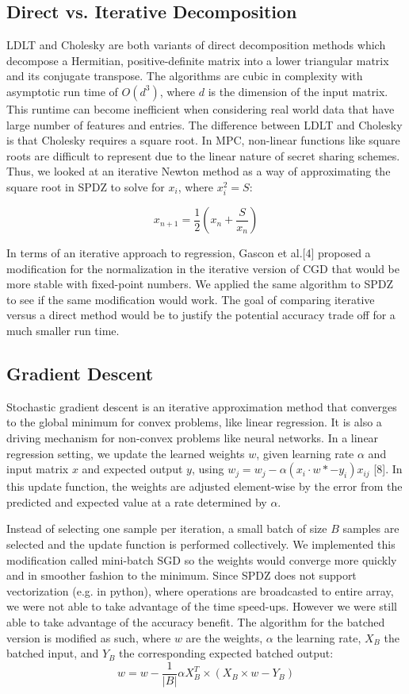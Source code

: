 \documentclass{article}
\begin{document}
\subsection{Direct vs. Iterative Decomposition}

LDLT and Cholesky are both variants of direct decomposition methods which decompose a Hermitian, positive-definite matrix into a lower triangular matrix and its conjugate transpose. The algorithms are cubic in complexity with asymptotic run time of $O(d^3)$, where $d$ is the dimension of the input matrix. This runtime can become inefficient when considering real world data that have large number of features and entries. The difference between LDLT and Cholesky is that Cholesky requires a square root. In MPC, non-linear functions like square roots are difficult to represent due to the linear nature of secret sharing schemes. Thus, we looked at an iterative Newton method as a way of approximating the square root in SPDZ to solve for $x_i$, where $x_{i}^2 = S$:

\[
x_{n+1} = \frac{1}{2} (x_{n} + \frac{S}{x_{n}})
\]

In terms of an iterative approach to regression, Gascon et al.[4] proposed a modification for the normalization in the iterative version of CGD that would be more stable with fixed-point numbers. We applied the same algorithm to SPDZ to see if the same modification would work. The goal of comparing iterative versus a direct method would be to justify the potential accuracy trade off for a much smaller run time.

\subsection{Gradient Descent}

Stochastic gradient descent is an iterative approximation method that converges to the global minimum for convex problems, like linear regression. It is also a driving mechanism for non-convex problems like neural networks. In a linear regression setting, we update the learned weights $w$, given learning rate $\alpha$ and input matrix $x$ and expected output $y$, using $w_j = w_j  - \alpha(x_i \cdot w *-y_i)x_{ij}$ [8]. In this update function, the weights are adjusted element-wise by the error from the predicted and expected value at a rate determined by $\alpha$.

Instead of selecting one sample per iteration, a small batch of size $B$ samples are selected and the update function is performed collectively. We implemented this modification called mini-batch SGD so the weights would converge more quickly and in smoother fashion to the minimum. Since SPDZ does not support vectorization (e.g. in python), where operations are broadcasted to entire array, we were not able to take advantage of the time speed-ups. However we were still able to take advantage of the accuracy benefit. The algorithm for the batched version is modified as such, where $w$ are the weights, $\alpha$ the learning rate, $X_{B}$ the batched input, and $Y_{B}$ the corresponding expected batched output: 
\[
 w = w - \frac{1}{|B|} \alpha X^{T}_{B} \times (X_{B} \times w - Y_{B})
\]
\end{document}
